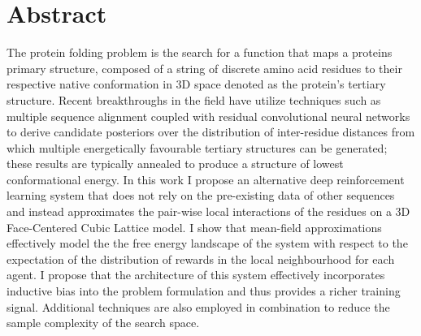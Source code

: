 
\chapter*{Abstract}

The protein folding problem is the search for a 
function that maps a proteins primary structure, 
composed of a string of discrete amino acid residues to 
their respective native conformation in 
3D space denoted as the protein's tertiary structure. 
Recent breakthroughs in the field have utilize 
techniques such as multiple sequence alignment 
coupled with residual convolutional neural networks 
to derive candidate posteriors over the distribution 
of inter-residue distances from which multiple 
energetically favourable tertiary structures can be 
generated; these results are typically annealed to produce 
a structure of lowest conformational energy. In this work 
I propose an alternative deep reinforcement learning 
system that does not rely on the pre-existing data of 
other sequences and instead approximates the pair-wise 
local interactions of the residues on a 
3D Face-Centered Cubic Lattice model. 
I show that mean-field approximations 
effectively model the the free energy landscape 
of the system with respect to the expectation of 
the distribution of rewards in the local neighbourhood 
for each agent. I propose that the architecture of 
this system effectively incorporates inductive bias 
into the problem formulation and thus provides a 
richer training signal. Additional techniques are 
also employed in combination to 
reduce the sample complexity of the search space.
